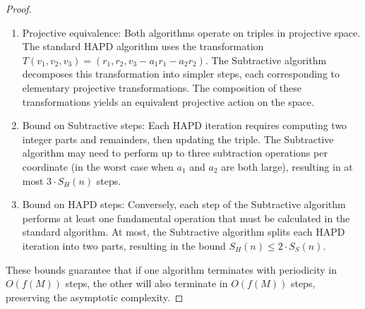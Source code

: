 \begin{proof}
\begin{enumerate}
\item Projective equivalence: Both algorithms operate on triples in projective space. The standard HAPD algorithm uses the transformation $T(v_1, v_2, v_3) = (r_1, r_2, v_3 - a_1r_1 - a_2r_2)$. The Subtractive algorithm decomposes this transformation into simpler steps, each corresponding to elementary projective transformations. The composition of these transformations yields an equivalent projective action on the space.

\item Bound on Subtractive steps: Each HAPD iteration requires computing two integer parts and remainders, then updating the triple. The Subtractive algorithm may need to perform up to three subtraction operations per coordinate (in the worst case when $a_1$ and $a_2$ are both large), resulting in at most $3 \cdot S_H(n)$ steps.

\item Bound on HAPD steps: Conversely, each step of the Subtractive algorithm performs at least one fundamental operation that must be calculated in the standard algorithm. At most, the Subtractive algorithm splits each HAPD iteration into two parts, resulting in the bound $S_H(n) \leq 2 \cdot S_S(n)$.
\end{enumerate}

These bounds guarantee that if one algorithm terminates with periodicity in $O(f(M))$ steps, the other will also terminate in $O(f(M))$ steps, preserving the asymptotic complexity.
\end{proof}